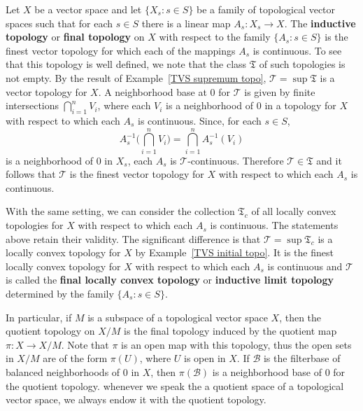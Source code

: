 \begin{example}\label{TVS final topo}
Let $X$ be a vector space and let $\{X_s:s\in S\}$ be a family of topological vector spaces such that for each $s\in S$ there is a linear map $A_s:X_s\to X$. The \textbf{inductive topology} or \textbf{final topology} on $X$ with respect to the family $\{A_s:s\in S\}$ is the finest vector topology for which each of the mappings $A_s$ is continuous. To see that this topology is well defined, we note that the class $\mathfrak{T}$ of such topologies is not empty. By the result of Example~\ref{TVS supremum topo}, $\mathcal{T}=\sup\mathfrak{T}$ is a vector topology for $X$. A neighborhood base at $0$ for $\mathcal{T}$ is given by finite intersections $\bigcap_{i=1}^{n}V_{i}$, where each $V_i$ is a neighborhood of $0$ in a topology for $X$ with respect to which each $A_s$ is continuous. Since, for each $s\in S$,
\[A_s^{-1}\Big(\bigcap_{i=1}^{n}V_i\Big)=\bigcap_{i=1}^{n}A_s^{-1}(V_i)\]
is a neighborhood of $0$ in $X_s$, each $A_s$ is $\mathcal{T}$-continuous. Therefore $\mathcal{T}\in\mathfrak{T}$ and it follows that $\mathcal{T}$ is the finest vector topology for $X$ with respect to which each $A_s$ is continuous.\par
With the same setting, we can consider the collection $\mathfrak{T}_c$ of all locally convex topologies for $X$ with respect to which each $A_s$ is continuous. The statements above retain their validity. The significant difference is that $\mathcal{T}=\sup\mathfrak{T}_c$ is a locally convex topology for $X$ by Example~\ref{TVS initial topo}. It is the finest locally convex topology for $X$ with respect to which each $A_s$ is continuous and $\mathcal{T}$ is called the \textbf{final locally convex topology} or \textbf{inductive limit topology} determined by the family $\{A_s:s\in S\}$.
\end{example}
\begin{example}
In particular, if $M$ is a subspace of a topological vector space $X$, then the quotient topology on $X/M$ is the final topology induced by the quotient map $\pi:X\to X/M$. Note that $\pi$ is an open map with this topology, thus the open sets in $X/M$ are of the form $\pi(U)$, where $U$ is open in $X$. If $\mathcal{B}$ is the filterbase of balanced neighborhoods of $0$ in $X$, then $\pi(\mathcal{B})$ is a neighborhood base of $0$ for the quotient topology. whenever we speak the a quotient space of a topological vector space, we always endow it with the quotient topology.
\end{example}
